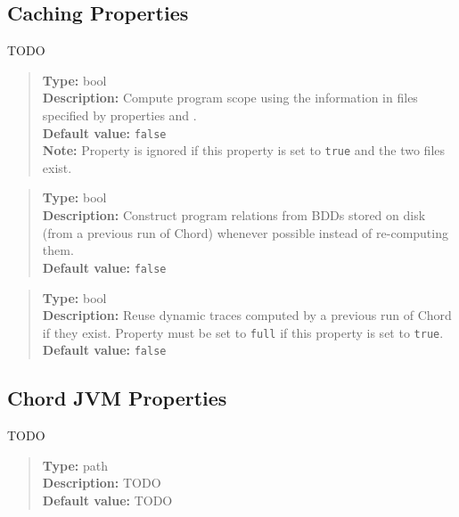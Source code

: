\subsection{Caching Properties}
\label{sec:caching-props}

TODO
\\[10pt]

\begin{quote}
{\bf Type:} bool \\
{\bf Description:} Compute program scope using the information in files specified by properties  and . \\
{\bf Default value:} {\tt false} \\
{\bf Note:} Property  is ignored if this property is set to {\tt true} and the two files exist. 
\end{quote}

\begin{quote}
{\bf Type:} bool  \\
{\bf Description:} Construct program relations from BDDs stored on disk (from a previous run of Chord) whenever possible instead of re-computing them. \\
{\bf Default value:} {\tt false}
\end{quote}

\begin{quote}
{\bf Type:} bool \\
{\bf Description:} Reuse dynamic traces computed by a previous run of Chord if they exist.  Property  must be set to {\tt full} if this property is set to {\tt true}. \\
{\bf Default value:} {\tt false}
\end{quote}

\subsection{Chord JVM Properties}
\label{sec:jvm-props}

TODO
\\[10pt]

\begin{quote}
{\bf Type:} path \\
{\bf Description:} TODO \\
{\bf Default value:} TODO
\end{quote}

